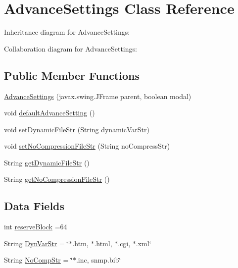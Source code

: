 \hypertarget{class_microchip_m_p_f_s_1_1_advance_settings}{}\section{Advance\+Settings Class Reference}
\label{class_microchip_m_p_f_s_1_1_advance_settings}


Inheritance diagram for Advance\+Settings\+:


Collaboration diagram for Advance\+Settings\+:
\subsection*{Public Member Functions}
\begin{DoxyCompactItemize}
\item 
\hyperlink{class_microchip_m_p_f_s_1_1_advance_settings_a44738099bc015d764fe19d1b70235cf3}{Advance\+Settings} (javax.\+swing.\+J\+Frame parent, boolean modal)
\item 
void \hyperlink{class_microchip_m_p_f_s_1_1_advance_settings_a05e75ee7f030bff775c658a9d0d697f3}{default\+Advance\+Setting} ()
\item 
void \hyperlink{class_microchip_m_p_f_s_1_1_advance_settings_a035dfbf2ae6fae22ab9d5ecad9b27e04}{set\+Dynamic\+File\+Str} (String dynamic\+Var\+Str)
\item 
void \hyperlink{class_microchip_m_p_f_s_1_1_advance_settings_af5b18766e4273c805a5011f1d463e9f4}{set\+No\+Compression\+File\+Str} (String no\+Compress\+Str)
\item 
String \hyperlink{class_microchip_m_p_f_s_1_1_advance_settings_a6afc490478269a6c0956479645095434}{get\+Dynamic\+File\+Str} ()
\item 
String \hyperlink{class_microchip_m_p_f_s_1_1_advance_settings_a286eb4dee454d7336b294e51a69c9a76}{get\+No\+Compression\+File\+Str} ()
\end{DoxyCompactItemize}
\subsection*{Data Fields}
\begin{DoxyCompactItemize}
\item 
int \hyperlink{class_microchip_m_p_f_s_1_1_advance_settings_af02585e952b32afd48b049ca223cc360}{reserve\+Block} =64
\item 
String \hyperlink{class_microchip_m_p_f_s_1_1_advance_settings_a5678caea3328c6053c17bbf2cde70e52}{Dyn\+Var\+Str} = \char`\"{}$\ast$.htm, $\ast$.html, $\ast$.cgi, $\ast$.xml\char`\"{}
\item 
String \hyperlink{class_microchip_m_p_f_s_1_1_advance_settings_a565edbbd403daa2dba38f7382d372d37}{No\+Comp\+Str} = \char`\"{}$\ast$.inc, snmp.\+bib\char`\"{}
\end{DoxyCompactItemize}


